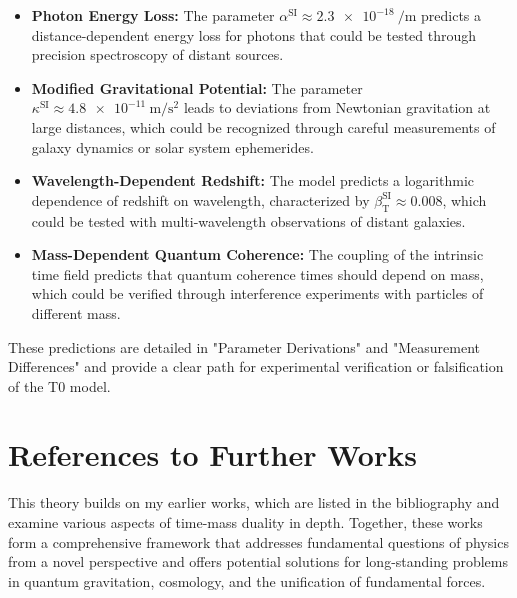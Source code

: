 \documentclass[a4paper,12pt]{article}
\newcommand{\betaT}{\beta_{\text{T}}}
\begin{document}
	\begin{itemize}
		\item \textbf{Photon Energy Loss:} The parameter $\alpha^{\text{SI}} \approx \SI{2,3e-18}{\per\meter}$ predicts a distance-dependent energy loss for photons that could be tested through precision spectroscopy of distant sources.
		
		\item \textbf{Modified Gravitational Potential:} The parameter $\kappa^{\text{SI}} \approx \SI{4,8e-11}{\meter\per\second\squared}$ leads to deviations from Newtonian gravitation at large distances, which could be recognized through careful measurements of galaxy dynamics or solar system ephemerides.
		
		\item \textbf{Wavelength-Dependent Redshift:} The model predicts a logarithmic dependence of redshift on wavelength, characterized by $\betaT^{\text{SI}} \approx 0.008$, which could be tested with multi-wavelength observations of distant galaxies.
		
		\item \textbf{Mass-Dependent Quantum Coherence:} The coupling of the intrinsic time field predicts that quantum coherence times should depend on mass, which could be verified through interference experiments with particles of different mass.
	\end{itemize}
	
	These predictions are detailed in "Parameter Derivations" \cite{pascher_params_2025} and "Measurement Differences" \cite{pascher_messdifferenzen_2025} and provide a clear path for experimental verification or falsification of the T0 model.
	
	\section{References to Further Works}
	
	This theory builds on my earlier works, which are listed in the bibliography and examine various aspects of time-mass duality in depth. Together, these works form a comprehensive framework that addresses fundamental questions of physics from a novel perspective and offers potential solutions for long-standing problems in quantum gravitation, cosmology, and the unification of fundamental forces.
	
\end{document}
